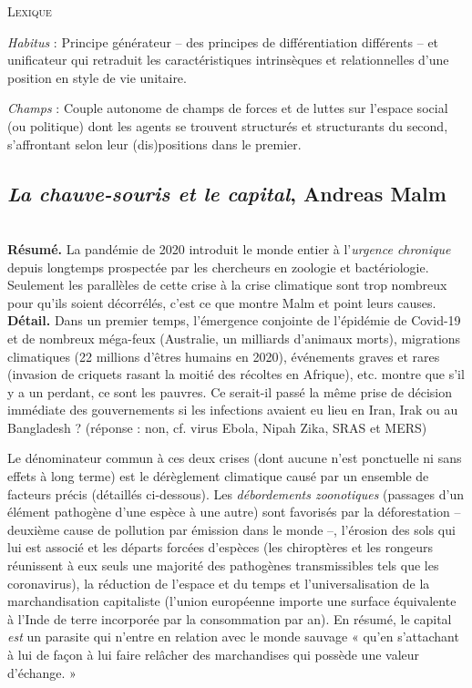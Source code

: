 \documentclass[11pt]{amsart}
\begin{document}
\hspace*{0.4cm}

\begin{center}\textsc{Lexique} \end{center}

\textsl{Habitus} : Principe générateur – des principes de différentiation différents – et unificateur qui retraduit les caractéristiques intrinsèques et relationnelles d'une position en style de vie unitaire. 

\textsl{Champs} : Couple autonome de champs de forces et de luttes sur l'espace social (ou politique) dont les agents se trouvent structurés et structurants du second, s'affrontant selon leur (dis)positions dans le premier.

\newpage 

\subsection*{\textsl{La chauve-souris et le capital}, Andreas Malm}$ $\\

\textbf{Résumé.} La pandémie de 2020 introduit le monde entier à l'\textit{urgence chronique} depuis longtemps prospectée par les chercheurs en zoologie et bactériologie. Seulement les parallèles de cette crise à la crise climatique sont trop nombreux pour qu'ils soient décorrélés, c'est ce que montre Malm et point leurs causes.\\

\textbf{Détail.} Dans un premier temps, l'émergence conjointe de l'épidémie de Covid-19 et de nombreux méga-feux (Australie, un milliards d'animaux morts), migrations climatiques (22 millions d'êtres humains en 2020), événements graves et rares (invasion de criquets rasant la moitié des récoltes en Afrique), etc. montre que s'il y a un perdant, ce sont les pauvres. Ce serait-il passé la même prise de décision immédiate des gouvernements si les infections avaient eu lieu en Iran, Irak ou au Bangladesh ? (réponse : non, cf. virus Ebola, Nipah Zika, SRAS et MERS)

Le dénominateur commun à ces deux crises (dont aucune n'est ponctuelle ni sans effets à long terme) est le dérèglement climatique causé par un ensemble de facteurs précis (détaillés ci-dessous). Les \textit{débordements zoonotiques} (passages d'un élément pathogène d'une espèce à une autre) sont favorisés par la déforestation – deuxième cause de pollution par émission dans le monde –, l'érosion des sols qui lui est associé et les départs forcées d'espèces (les chiroptères et les rongeurs réunissent à eux seuls une majorité des pathogènes transmissibles tels que les coronavirus), la réduction de l'espace et du temps et l'universalisation de la marchandisation capitaliste (l'union européenne importe une surface équivalente à l'Inde de terre incorporée par la consommation par an). En résumé, le capital \textit{est} un parasite qui n'entre en relation avec le monde sauvage « qu'en s’attachant à lui de façon à lui faire relâcher des marchandises qui possède une valeur d'échange. »
\end{document}
